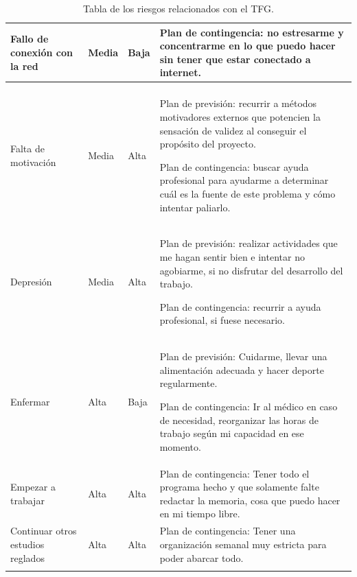 \begin{longtable}{|>{\centering\arraybackslash}m{5cm}|>{\centering\arraybackslash}m{2cm}|>{\centering\arraybackslash}m{2cm}|>{\centering\arraybackslash}m{7cm}|}
	\hline
	
	Fallo de conexión con la red & Media & Baja & Plan de contingencia: no estresarme y concentrarme en lo que puedo hacer sin tener que estar conectado a internet.
	\\
	
	\hline
	
	\rowcolor{lightgray}
	
	\multicolumn{4}{|c|}{Personas} \\
	
	\hline
	
	Falta de motivación & Media & Alta & Plan de previsión: recurrir a métodos motivadores externos que potencien la sensación de validez al conseguir el propósito del proyecto.
	
	
	
	Plan de contingencia: buscar ayuda profesional para ayudarme a determinar cuál es la fuente de este problema y cómo intentar paliarlo.
	\\
	
	\hline
	
	Depresión & Media & Alta & Plan de previsión: realizar actividades que me hagan sentir bien e intentar no agobiarme, si no disfrutar del desarrollo del trabajo.
	
	
	
	Plan de contingencia: recurrir a ayuda profesional, si fuese necesario.
	\\
	
	\hline
	
	Enfermar & Alta & Baja & Plan de previsión: Cuidarme, llevar una alimentación adecuada y hacer deporte regularmente.
	
	
	
	Plan de contingencia: Ir al médico en caso de necesidad, reorganizar las horas de trabajo según mi capacidad en ese momento.
	\\
	
	\hline
	
	Empezar a trabajar & Alta & Alta & Plan de contingencia: Tener todo el programa hecho y que solamente falte redactar la memoria, cosa que puedo hacer en mi tiempo libre.
	\\
	
	\hline
	
	Continuar otros estudios reglados & Alta & Alta & Plan de contingencia: Tener una organización semanal muy estricta para poder abarcar todo.
	\\
	
	\hline
	
	\caption{Tabla de los riesgos relacionados con el TFG.}
	
	\label{tabla de riesgos}
	
\end{longtable}




